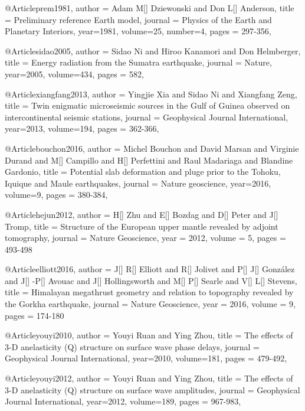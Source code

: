 @Article{prem1981,
  author =	 {Adam M[] Dziewonski and Don L[] Anderson},
  title =	 {Preliminary reference Earth model},
  journal =	 {Physics of the Earth and Planetary Interiors},
  year=1981,
  volume=25,
  number=4,
  pages =	 {297-356},
}



@Article{sidao2005,
  author =	 {Sidao Ni and Hiroo Kanamori and Don Helmberger},
  title =	 {Energy radiation from the Sumatra earthquake},
  journal =	 {Nature},
  year=2005,
  volume=434,
  pages =	 {582},
}

@Article{xiangfang2013,
  author =	 {Yingjie Xia and Sidao Ni and Xiangfang Zeng},
  title =	 {Twin enigmatic microseismic sources in the Gulf of Guinea observed on intercontinental seismic stations},
  journal =	 {Geophysical Journal International},
  year=2013,
  volume=194,
  pages =	 {362-366},
}

@Article{bouchon2016,
  author =	 {Michel Bouchon and David Marsan and Virginie Durand and M[] Campillo and H[] Perfettini and Raul Madariaga and Blandine Gardonio},
  title =	 {Potential slab deformation and pluge prior to the {T}ohoku, {I}quique and {M}aule earthquakes},
  journal =	 {Nature geoscience},
  year=2016,
  volume=9,
  pages =	 {380-384},
}

@Article{hejun2012,
  author = 	 {H[] Zhu and E[] Bozdag and D[] Peter and J[] Tromp},
  title = 	 {Structure of the European upper mantle revealed by adjoint tomography},
  journal = 	 {Nature Geoscience},
  year = 	 2012,
  volume = 5,
  pages =	 {493-498}
}

@Article{elliott2016,
  author = 	 {J[] R[] Elliott and R[] Jolivet and P[] J[] Gonz\'{a}lez and J[] -P[] Avouac and J[] Hollingsworth and M[] P[] Searle and V[] L[] Stevens},
  title = 	 {Himalayan megathrust geometry and relation to topography revealed by the {G}orkha earthquake},
  journal = 	 {Nature Geoscience},
  year = 	 2016,
  volume = 9,
  pages =	 {174-180}
}

@Article{youyi2010,
  author =	 {Youyi Ruan and Ying Zhou},
  title =	 {The effects of 3-D anelasticity (Q) structure on surface wave phase delays},
  journal =	 {Geophysical Journal International},
  year=2010,
  volume=181,
  pages =	 {479-492},
}

@Article{youyi2012,
  author =	 {Youyi Ruan and Ying Zhou},
  title =	 {The effects of 3-D anelasticity (Q) structure on surface wave amplitudes},
  journal =	 {Geophysical Journal International},
  year=2012,
  volume=189,
  pages =	 {967-983},
}

